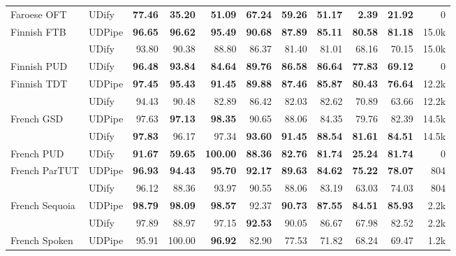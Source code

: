 \documentclass[11pt,a4paper]{article}
\begin{document}
\begin{table*}
\begin{center}
\begin{tabular}{@{}llrrrrrrrrr@{}}
    \addlinespace
    Faroese OFT & UDify &  \bf 77.46 &  \bf 35.20 &   \bf 51.09 &  \bf 67.24 &  \bf 59.26 &  \bf 51.17 &   \bf 2.39 &  \bf 21.92 &      0 \\
    \addlinespace
    Finnish FTB & UDPipe &  \bf 96.65 &  \bf 96.62 &   \bf 95.49 &  \bf 90.68 &  \bf 87.89 &  \bf 85.11 &  \bf 80.58 &  \bf 81.18 &  15.0k \\
               & UDify &      93.80 &      90.38 &       88.80 &      86.37 &      81.40 &      81.01 &      68.16 &      70.15 &  15.0k \\
    \addlinespace
    Finnish PUD & UDify &  \bf 96.48 &  \bf 93.84 &   \bf 84.64 &  \bf 89.76 &  \bf 86.58 &  \bf 86.64 &  \bf 77.83 &  \bf 69.12 &      0 \\
    \addlinespace
    Finnish TDT & UDPipe &  \bf 97.45 &  \bf 95.43 &   \bf 91.45 &  \bf 89.88 &  \bf 87.46 &  \bf 85.87 &  \bf 80.43 &  \bf 76.64 &  12.2k \\
               & UDify &      94.43 &      90.48 &       82.89 &      86.42 &      82.03 &      82.62 &      70.89 &      63.66 &  12.2k \\
    \addlinespace
    French GSD & UDPipe &      97.63 &  \bf 97.13 &   \bf 98.35 &      90.65 &      88.06 &      84.35 &      79.76 &      82.39 &  14.5k \\
               & UDify &  \bf 97.83 &      96.17 &       97.34 &  \bf 93.60 &  \bf 91.45 &  \bf 88.54 &  \bf 81.61 &  \bf 84.51 &  14.5k \\
    \addlinespace
    French PUD & UDify &  \bf 91.67 &  \bf 59.65 &  \bf 100.00 &  \bf 88.36 &  \bf 82.76 &  \bf 81.74 &  \bf 25.24 &  \bf 81.74 &      0 \\
    \addlinespace
    French ParTUT & UDPipe &  \bf 96.93 &  \bf 94.43 &   \bf 95.70 &  \bf 92.17 &  \bf 89.63 &  \bf 84.62 &  \bf 75.22 &  \bf 78.07 &    804 \\
               & UDify &      96.12 &      88.36 &       93.97 &      90.55 &      88.06 &      83.19 &      63.03 &      74.03 &    804 \\
    \addlinespace
    French Sequoia & UDPipe &  \bf 98.79 &  \bf 98.09 &   \bf 98.57 &      92.37 &  \bf 90.73 &  \bf 87.55 &  \bf 84.51 &  \bf 85.93 &   2.2k \\
               & UDify &      97.89 &      88.97 &       97.15 &  \bf 92.53 &      90.05 &      86.67 &      67.98 &      82.52 &   2.2k \\
    \addlinespace
    French Spoken & UDPipe &      95.91 &     100.00 &   \bf 96.92 &      82.90 &      77.53 &      71.82 &      68.24 &      69.47 &   1.2k \\

\end{tabular}
\end{center}
\end{table*}
\end{document}
